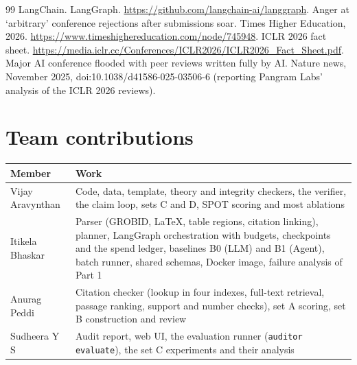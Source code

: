 \documentclass[11pt,a4paper]{article}
\begin{document}
\begin{thebibliography}{99}
 LangChain. LangGraph. \url{https://github.com/langchain-ai/langgraph}.
 Anger at `arbitrary' conference rejections after submissions soar. Times Higher Education, 2026. \url{https://www.timeshighereducation.com/node/745948}.
 ICLR 2026 fact sheet. \url{https://media.iclr.cc/Conferences/ICLR2026/ICLR2026_Fact_Sheet.pdf}.
 Major AI conference flooded with peer reviews written fully by AI. Nature news, November 2025, doi:10.1038/d41586-025-03506-6 (reporting Pangram Labs' analysis of the ICLR 2026 reviews).
\end{thebibliography}

\appendix
\section{Team contributions}
\begin{tabularx}{\textwidth}{@{}lX@{}}
\toprule
Member & Work \\
\midrule
Vijay Aravynthan & Code, data, template, theory and integrity checkers, the verifier, the claim loop, sets C and D, SPOT scoring and most ablations \\
Itikela Bhaskar & Parser (GROBID, LaTeX, table regions, citation linking), planner, LangGraph orchestration with budgets, checkpoints and the spend ledger, baselines B0 (LLM) and B1 (Agent), batch runner, shared schemas, Docker image, failure analysis of Part 1 \\
Anurag Peddi & Citation checker (lookup in four indexes, full-text retrieval, passage ranking, support and number checks), set A scoring, set B construction and review \\
Sudheera Y S & Audit report, web UI, the evaluation runner (\texttt{auditor evaluate}), the set C experiments and their analysis \\
\bottomrule
\end{tabularx}
\end{document}
